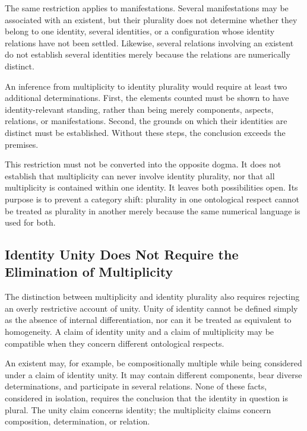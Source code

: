 The same restriction applies to manifestations. Several manifestations
may be associated with an existent, but their plurality does not
determine whether they belong to one identity, several identities,
or a configuration whose identity relations have not been settled.
Likewise, several relations involving an existent do not establish
several identities merely because the relations are numerically
distinct.

An inference from multiplicity to identity plurality would require
at least two additional determinations. First, the elements counted
must be shown to have identity-relevant standing, rather than being
merely components, aspects, relations, or manifestations. Second,
the grounds on which their identities are distinct must be established.
Without these steps, the conclusion exceeds the premises.

This restriction must not be converted into the opposite dogma.
It does not establish that multiplicity can never involve identity
plurality, nor that all multiplicity is contained within one identity.
It leaves both possibilities open. Its purpose is to prevent a
category shift: plurality in one ontological respect cannot be
treated as plurality in another merely because the same numerical
language is used for both.

\subsection{Identity Unity Does Not Require the Elimination of Multiplicity}

The distinction between multiplicity and identity plurality also
requires rejecting an overly restrictive account of unity. Unity
of identity cannot be defined simply as the absence of internal
differentiation, nor can it be treated as equivalent to homogeneity.
A claim of identity unity and a claim of multiplicity may be
compatible when they concern different ontological respects.

An existent may, for example, be compositionally multiple while
being considered under a claim of identity unity. It may contain
different components, bear diverse determinations, and participate
in several relations. None of these facts, considered in isolation,
requires the conclusion that the identity in question is plural.
The unity claim concerns identity; the multiplicity claims concern
composition, determination, or relation.

